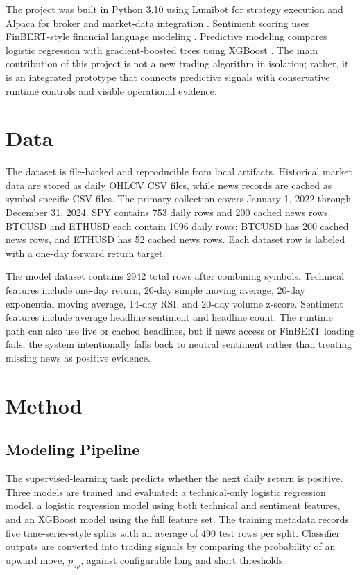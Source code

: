 \documentclass[sigconf,nonacm]{acmart}
\begin{document}
The project was built in Python 3.10 using Lumibot for strategy execution and Alpaca for broker and market-data integration \cite{lumibotdocs,alpacadocs}. Sentiment scoring uses FinBERT-style financial language modeling \cite{araci2019finbert}. Predictive modeling compares logistic regression with gradient-boosted trees using XGBoost \cite{chen2016xgboost}. The main contribution of this project is not a new trading algorithm in isolation; rather, it is an integrated prototype that connects predictive signals with conservative runtime controls and visible operational evidence.

\section{Data}
The dataset is file-backed and reproducible from local artifacts. Historical market data are stored as daily OHLCV CSV files, while news records are cached as symbol-specific CSV files. The primary collection covers January 1, 2022 through December 31, 2024. SPY contains 753 daily rows and 200 cached news rows. BTCUSD and ETHUSD each contain 1096 daily rows; BTCUSD has 200 cached news rows, and ETHUSD has 52 cached news rows. Each dataset row is labeled with a one-day forward return target.

The model dataset contains 2942 total rows after combining symbols. Technical features include one-day return, 20-day simple moving average, 20-day exponential moving average, 14-day RSI, and 20-day volume z-score. Sentiment features include average headline sentiment and headline count. The runtime path can also use live or cached headlines, but if news access or FinBERT loading fails, the system intentionally falls back to neutral sentiment rather than treating missing news as positive evidence.

\section{Method}
\subsection{Modeling Pipeline}
The supervised-learning task predicts whether the next daily return is positive. Three models are trained and evaluated: a technical-only logistic regression model, a logistic regression model using both technical and sentiment features, and an XGBoost model using the full feature set. The training metadata records five time-series-style splits with an average of 490 test rows per split. Classifier outputs are converted into trading signals by comparing the probability of an upward move, \(p_{up}\), against configurable long and short thresholds.
\end{document}
